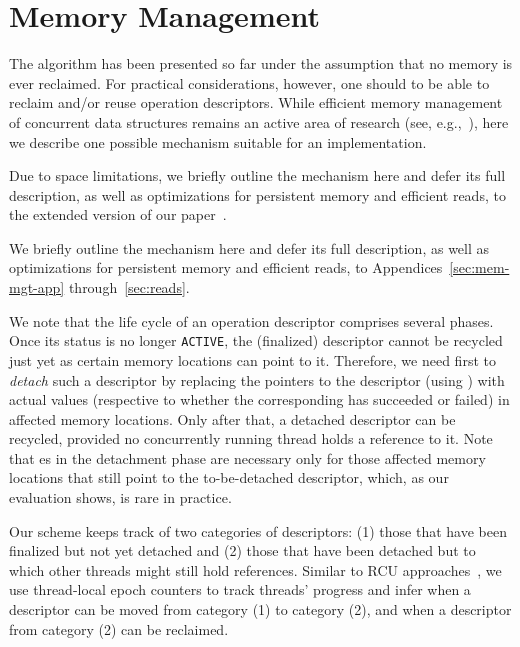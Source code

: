 
\section{Memory Management}
\label{sec:mem-mgmt}

The \mcas{} algorithm has been presented so far under the assumption that no memory is ever reclaimed.
For practical considerations, however, one should to be able to reclaim and/or reuse \mcas{} operation descriptors.
While efficient memory management of concurrent data structures remains an active area of research 
(see, e.g.,~\cite{alistarh17,Brown15, DHK16,poter18,wen18}),
here we describe one possible mechanism suitable for an \mcas{} implementation. 
\begin{camera} 
Due to space limitations, we briefly outline the mechanism here and defer its full description, as well as optimizations for persistent memory and efficient reads, to the extended version of our paper~\cite{longversion}.
\end{camera}\begin{arxiv}
We briefly outline the mechanism here and defer its full description, as well as optimizations for persistent memory and efficient reads, to Appendices~\ref{sec:mem-mgt-app} through~\ref{sec:reads}.
\end{arxiv}

We note that the life cycle of an operation descriptor comprises several phases.
Once its status is no longer \texttt{ACTIVE}, the (finalized) descriptor cannot be recycled just yet as certain memory locations can point to it.
Therefore, we need first to \emph{detach} such a descriptor by replacing the pointers to the descriptor (using \cas{}) with actual values 
(respective to whether the corresponding \mcas{} has succeeded or failed) in affected memory locations.
Only after that, a detached descriptor can be recycled, provided no concurrently running thread holds a
reference to it.
Note that \cas{}es in the detachment phase are necessary only for those affected memory locations that still point to the to-be-detached descriptor, which, as our evaluation shows, is rare in practice.

Our scheme keeps track of two categories of descriptors: (1) those that have been finalized but not yet detached and (2) those that have been detached but to which other threads might still hold references. Similar to RCU approaches~\cite{McKenney17, MS98}, we use thread-local epoch counters to track threads' progress and infer when a descriptor can be moved from category (1) to category (2), and when a descriptor from category (2) can be reclaimed.

